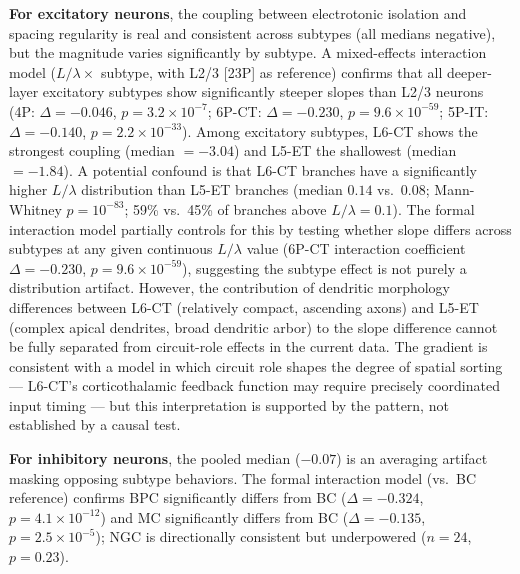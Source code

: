 \documentclass[11pt]{article}
\begin{document}
\textbf{For excitatory neurons}, the coupling between electrotonic isolation and spacing regularity is real and consistent across subtypes (all medians negative), but the magnitude varies significantly by subtype. A mixed-effects interaction model ($L/\lambda \times$ subtype, with L2/3 [23P] as reference) confirms that all deeper-layer excitatory subtypes show significantly steeper slopes than L2/3 neurons (4P: $\Delta = -0.046$, $p = 3.2 \times 10^{-7}$; 6P-CT: $\Delta = -0.230$, $p = 9.6 \times 10^{-59}$; 5P-IT: $\Delta = -0.140$, $p = 2.2 \times 10^{-33}$). Among excitatory subtypes, L6-CT shows the strongest coupling (median $= -3.04$) and L5-ET the shallowest (median $= -1.84$). A potential confound is that L6-CT branches have a significantly higher $L/\lambda$ distribution than L5-ET branches (median $0.14$ vs.\ $0.08$; Mann-Whitney $p = 10^{-83}$; 59\% vs.\ 45\% of branches above $L/\lambda = 0.1$). The formal interaction model partially controls for this by testing whether slope differs across subtypes at any given continuous $L/\lambda$ value (6P-CT interaction coefficient $\Delta = -0.230$, $p = 9.6 \times 10^{-59}$), suggesting the subtype effect is not purely a distribution artifact. However, the contribution of dendritic morphology differences between L6-CT (relatively compact, ascending axons) and L5-ET (complex apical dendrites, broad dendritic arbor) to the slope difference cannot be fully separated from circuit-role effects in the current data. The gradient is consistent with a model in which circuit role shapes the degree of spatial sorting --- L6-CT's corticothalamic feedback function may require precisely coordinated input timing --- but this interpretation is supported by the pattern, not established by a causal test.

\textbf{For inhibitory neurons}, the pooled median ($-0.07$) is an averaging artifact masking opposing subtype behaviors. The formal interaction model (vs.\ BC reference) confirms BPC significantly differs from BC ($\Delta = -0.324$, $p = 4.1 \times 10^{-12}$) and MC significantly differs from BC ($\Delta = -0.135$, $p = 2.5 \times 10^{-5}$); NGC is directionally consistent but underpowered ($n = 24$, $p = 0.23$).
\end{document}
